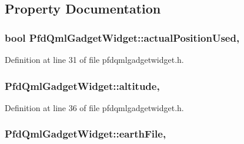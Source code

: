 \subsection{Property Documentation}
\hypertarget{class_pfd_qml_gadget_widget_a15d0bedd6fb1a7865b3ef2af0fdf303c}{
\subsubsection[{actual\-Position\-Used}]{\setlength{\rightskip}{0pt plus 5cm}bool Pfd\-Qml\-Gadget\-Widget\-::actual\-Position\-Used\hspace{0.3cm}{\ttfamily [read]}, {\ttfamily [write]}}}\label{class_pfd_qml_gadget_widget_a15d0bedd6fb1a7865b3ef2af0fdf303c}


Definition at line 31 of file pfdqmlgadgetwidget.\-h.

\hypertarget{class_pfd_qml_gadget_widget_a1ec3b0cfb482e75513c5beb4a016292d}{
\subsubsection[{altitude}]{ Pfd\-Qml\-Gadget\-Widget\-::altitude\hspace{0.3cm}{\ttfamily [read]}, {\ttfamily [write]}}}\label{class_pfd_qml_gadget_widget_a1ec3b0cfb482e75513c5beb4a016292d}


Definition at line 36 of file pfdqmlgadgetwidget.\-h.

\hypertarget{class_pfd_qml_gadget_widget_adc9e7df9c144b68f563c6e72c2cabff7}{
\subsubsection[{earth\-File}]{ Pfd\-Qml\-Gadget\-Widget\-::earth\-File\hspace{0.3cm}{\ttfamily [read]}, {\ttfamily [write]}}}\label{class_pfd_qml_gadget_widget_adc9e7df9c144b68f563c6e72c2cabff7}


